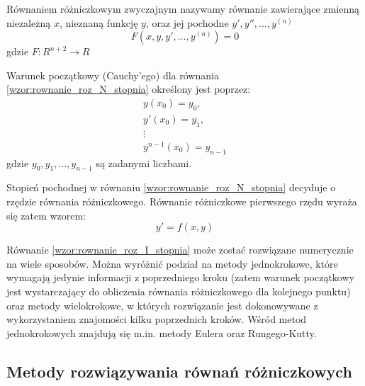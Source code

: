 Równaniem różniczkowym zwyczajnym nazywamy równanie zawierające zmienną niezależną $x$, nieznaną funkcję $y$, oraz jej pochodne $y', y'', \hdots, y^{(n)}$ \cite{BCh_2001}
\begin{equation}
	\label{wzor:rownanie_roz_N_stopnia}
	F(x,y,y',\hdots,y^{(n)}) = 0
\end{equation}
gdzie $F:R^{n+2} \rightarrow R$

Warunek początkowy (Cauchy'ego) dla równania \eqref{wzor:rownanie_roz_N_stopnia} określony jest poprzez: 
\begin{equation}
\begin{array}{c}
y(x_0)       =  y_0,     \\
y'(x_0)      =  y_1,     \\
\vdots			   	     \\
y^{n-1}(x_0) = y_{n-1}
\end{array}
\end{equation}
gdzie $y_0, y_1, \hdots, y_{n-1}$ są zadanymi liczbami.

Stopień pochodnej w równaniu \eqref{wzor:rownanie_roz_N_stopnia} decyduje o rzędzie równania różniczkowego. Równanie różniczkowe pierwszego rzędu wyraża się zatem wzorem:
\begin{equation}
	\label{wzor:rownanie_roz_I_stopnia}
	y' = f(x,y)
\end{equation}

Równanie \eqref{wzor:rownanie_roz_I_stopnia} może zostać rozwiązane numerycznie na wiele sposobów. Można wyróżnić podział na metody jednokrokowe, które wymagają jedynie informacji z poprzedniego kroku (zatem warunek początkowy jest wystarczający do obliczenia równania różniczkowego dla kolejnego punktu) oraz metody wielokrokowe, w których rozwiązanie jest dokonowywane z wykorzystaniem znajomości kilku poprzednich kroków. Wśród metod jednokrokowych znajdują się m.in. metody Eulera oraz Rungego-Kutty.

\subsection{Metody rozwiązywania równań różniczkowych}

